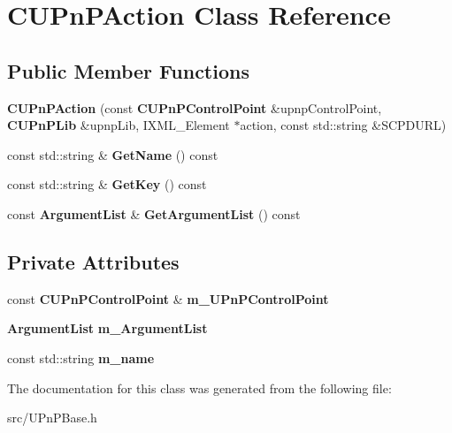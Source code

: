 \section{CUPnPAction Class Reference}
\label{classCUPnPAction}
\subsection*{Public Member Functions}
\begin{DoxyCompactItemize}
\item 
{\bfseries CUPnPAction} (const {\bf CUPnPControlPoint} \&upnpControlPoint, {\bf CUPnPLib} \&upnpLib, IXML\_\-Element $\ast$action, const std::string \&SCPDURL)\label{classCUPnPAction_a7ad93b6ff62640ea041370098607a8c1}

\item 
const std::string \& {\bfseries GetName} () const \label{classCUPnPAction_a99888814deea4cff7d48f3dd3bbaf5db}

\item 
const std::string \& {\bfseries GetKey} () const \label{classCUPnPAction_ab0962bb034a73eef9d664723b45a6e1a}

\item 
const {\bf ArgumentList} \& {\bfseries GetArgumentList} () const \label{classCUPnPAction_a11c6f06b47b4ff183f8703fd3d3ce294}

\end{DoxyCompactItemize}
\subsection*{Private Attributes}
\begin{DoxyCompactItemize}
\item 
const {\bf CUPnPControlPoint} \& {\bfseries m\_\-UPnPControlPoint}\label{classCUPnPAction_a3e4622b4b156240947d8ce123dc2adad}

\item 
{\bf ArgumentList} {\bfseries m\_\-ArgumentList}\label{classCUPnPAction_afc06de0b3d8b22f6d1fd62facee03d2d}

\item 
const std::string {\bfseries m\_\-name}\label{classCUPnPAction_a968f91d274cf19948bf7b2c731f83355}

\end{DoxyCompactItemize}


The documentation for this class was generated from the following file:\begin{DoxyCompactItemize}
\item 
src/UPnPBase.h\end{DoxyCompactItemize}
